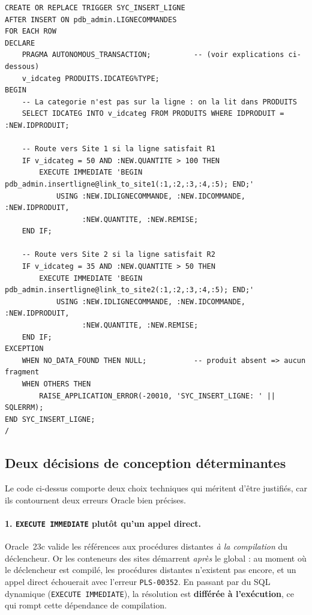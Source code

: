 \documentclass[11pt,a4paper]{article}
\begin{document}
\begin{lstlisting}[style=sql,caption={Déclencheur de routage à l'insertion, scénario~1 (extrait de \texttt{06\_create\_triggers.sql}).},label={lst:trig-insert}]
CREATE OR REPLACE TRIGGER SYC_INSERT_LIGNE
AFTER INSERT ON pdb_admin.LIGNECOMMANDES
FOR EACH ROW
DECLARE
    PRAGMA AUTONOMOUS_TRANSACTION;          -- (voir explications ci-dessous)
    v_idcateg PRODUITS.IDCATEG%TYPE;
BEGIN
    -- La categorie n'est pas sur la ligne : on la lit dans PRODUITS
    SELECT IDCATEG INTO v_idcateg FROM PRODUITS WHERE IDPRODUIT = :NEW.IDPRODUIT;

    -- Route vers Site 1 si la ligne satisfait R1
    IF v_idcateg = 50 AND :NEW.QUANTITE > 100 THEN
        EXECUTE IMMEDIATE 'BEGIN pdb_admin.insertligne@link_to_site1(:1,:2,:3,:4,:5); END;'
            USING :NEW.IDLIGNECOMMANDE, :NEW.IDCOMMANDE, :NEW.IDPRODUIT,
                  :NEW.QUANTITE, :NEW.REMISE;
    END IF;

    -- Route vers Site 2 si la ligne satisfait R2
    IF v_idcateg = 35 AND :NEW.QUANTITE > 50 THEN
        EXECUTE IMMEDIATE 'BEGIN pdb_admin.insertligne@link_to_site2(:1,:2,:3,:4,:5); END;'
            USING :NEW.IDLIGNECOMMANDE, :NEW.IDCOMMANDE, :NEW.IDPRODUIT,
                  :NEW.QUANTITE, :NEW.REMISE;
    END IF;
EXCEPTION
    WHEN NO_DATA_FOUND THEN NULL;           -- produit absent => aucun fragment
    WHEN OTHERS THEN
        RAISE_APPLICATION_ERROR(-20010, 'SYC_INSERT_LIGNE: ' || SQLERRM);
END SYC_INSERT_LIGNE;
/
\end{lstlisting}

\subsection{Deux décisions de conception déterminantes}

Le code ci-dessus comporte deux choix techniques qui méritent d'être justifiés,
car ils contournent deux erreurs Oracle bien précises.

\paragraph{1. \texttt{EXECUTE IMMEDIATE} plutôt qu'un appel direct.}
Oracle~23c valide les références aux procédures distantes \emph{à la compilation}
du déclencheur. Or les conteneurs des sites démarrent \emph{après} le global :
au moment où le déclencheur est compilé, les procédures distantes n'existent pas
encore, et un appel direct échouerait avec l'erreur \texttt{PLS-00352}. En
passant par du SQL dynamique (\texttt{EXECUTE IMMEDIATE}), la résolution est
\textbf{différée à l'exécution}, ce qui rompt cette dépendance de compilation.
\end{document}
